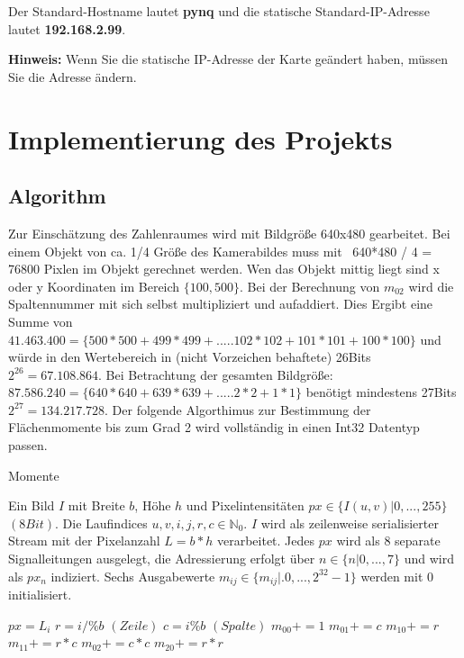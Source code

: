 \documentclass[a4paper]{report}
\begin{document}
Der Standard-Hostname lautet \textbf{pynq} und die statische Standard-IP-Adresse lautet \textbf{192.168.2.99}.

\textbf{Hinweis: } Wenn Sie die statische IP-Adresse der Karte geändert haben, müssen Sie die Adresse ändern. 




\chapter{Implementierung des Projekts}
\label{Implementierung_des_Projekts}

\section{Algorithm}
 
Zur Einschätzung des Zahlenraumes wird mit Bildgröße 640x480 gearbeitet. Bei einem Objekt von ca. 1/4 Größe des Kamerabildes muss mit ~640*480 / 4 = 76800 Pixlen im Objekt gerechnet werden. Wen das Objekt mittig liegt sind x oder y Koordinaten im Bereich $\{100,500\}$. Bei der Berechnung von $m_{02}$ wird die Spaltennummer mit sich selbst multipliziert und aufaddiert. Dies Ergibt eine Summe von $41.463.400=\{500*500+499*499+.....102*102+101*101+100*100\}$ und würde in den Wertebereich in (nicht Vorzeichen behaftete) 26Bits $2^{26}=67.108.864$. Bei  Betrachtung der gesamten Bildgröße: $87.586.240=\{640*640+639*639+.....2*2+1*1\}$ benötigt mindestens 27Bits $2^{27}=134.217.728$.
Der folgende Algorthimus zur Bestimmung der Flächenmomente bis zum Grad 2 wird vollständig in einen Int32 Datentyp passen.

 
\begin{algorithm}
\caption{Momente}
\label{Momente}
\begin{algorithmic}[1]
\Require Ein Bild $I$ mit Breite {$b$}, Höhe {$h$} und Pixelintensitäten $px\in \{I(u,v)|0,...,255\}$ $(8Bit)$. Die Laufindices $u,v,i,j,r,c \in \mathbb{N}_0$. $I$ wird als zeilenweise serialisierter Stream mit der Pixelanzahl {$L=b*h$} verarbeitet. Jedes $px$ wird als 8 separate Signalleitungen ausgelegt, die Adressierung erfolgt über $n\in \{n|0,...,7\}$ und wird als $px_n$ indiziert. Sechs Ausgabewerte {$m_{ij}\in \{m_{ij}|.0,...,2^{32}-1\}$} werden mit 0 initialisiert.

	\State $px = L_i$
    	\State $r=i/\%b$ $(Zeile)$
    	\State $c=i\%b$  $(Spalte)$
      	\State $m_{00}+=1$    
	    \State $m_{01}+= c$ 
    	\State $m_{10}+= r$
    	\State $m_{11}+= r*c$
    	\State $m_{02}+= c*c$
    	\State $m_{20}+= r*r$
    \EndIf
\EndFor
\end{algorithmic}
\end{algorithm}
\end{document}
